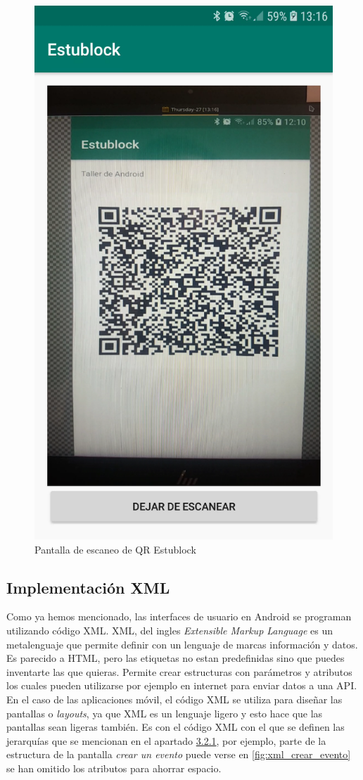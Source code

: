 \begin{figure}[h!]
  \centering
  \includegraphics[width=0.3\linewidth]{figs/Desarrollo/Interfaz/estublock_escanear_qr}
  \caption[Pantalla de Escaneo de QR]{Pantalla de escaneo de QR Estublock}
  \label{fig:pantalla_escaneo_qr}
\end{figure}

\subsection{Implementación XML}

Como ya hemos mencionado, las interfaces de usuario en Android se programan utilizando código XML. XML, del ingles \emph{Extensible Markup Language} es un metalenguaje que permite definir con un lenguaje de marcas información y datos. Es parecido a HTML, pero las etiquetas no estan predefinidas sino que puedes inventarte las que quieras. Permite crear estructuras con parámetros y atributos los cuales pueden utilizarse por ejemplo en internet para enviar datos a una API. En el caso de las aplicaciones móvil, el código XML se utiliza para diseñar las pantallas o \emph{layouts}, ya que XML es un lenguaje ligero y esto hace que las pantallas sean ligeras también. Es con el código XML con el que se definen las jerarquías que se mencionan en el apartado \hyperref[sec:GUI]{3.2.1}, por ejemplo, parte de la estructura de la pantalla \emph{crear un evento} puede verse en \ref{fig:xml_crear_evento} se han omitido los atributos para ahorrar espacio. 

